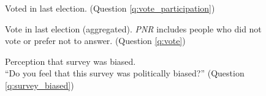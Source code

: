 \begin{figure}[h!] 
    \caption[Voted in last election]{Voted in last election. (Question \ref{q:vote_participation})}\label{fig:vote_participation}
\end{figure}

\begin{figure}[h!] 
    \caption[Vote in last election]{Vote in last election (aggregated). \textit{PNR} includes people who did not vote or prefer not to answer. (Question \ref{q:vote})}\label{fig:vote}
\end{figure}

\begin{figure}[h!] 
    \caption[Perception that survey was biased]{Perception that survey was biased. \\ ``Do you feel that this survey was politically biased?'' (Question \ref{q:survey_biased})}\label{fig:survey_biased}
\end{figure}

